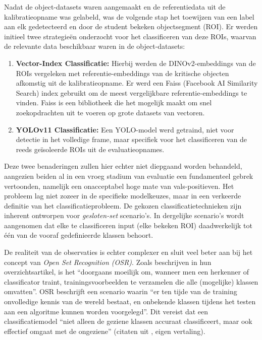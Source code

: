 Nadat de object-datasets waren aangemaakt en de referentiedata uit de kalibratieopname was gelabeld, was de volgende stap het 
toewijzen van een label aan elk gedetecteerd en door de student bekeken objectsegment (ROI). 
Er werden initieel twee strategieën onderzocht voor het classificeren van deze ROIs, waarvan de relevante data beschikbaar waren in de object-datasets:
\begin{enumerate}
    \item \textbf{Vector-Index Classificatie:} Hierbij werden de DINOv2-embeddings van de ROIs vergeleken met referentie-embeddings van de kritische objecten afkomstig uit de kalibratieopname.
    Er werd een Faiss (Facebook AI Similarity Search) index gebruikt om de meest vergelijkbare referentie-embeddings te vinden.
    Faiss is een bibliotheek die het mogelijk maakt om snel zoekopdrachten uit te voeren op grote datasets van vectoren.
    \item \textbf{YOLOv11 Classificatie:} Een YOLO-model werd getraind, niet voor detectie in het volledige frame, maar specifiek voor het classificeren van de reeds 
    geïsoleerde ROIs uit de evaluatieopnames.
\end{enumerate}

Deze twee benaderingen zullen hier echter niet diepgaand worden behandeld, 
aangezien beiden al in een vroeg stadium van evaluatie een fundamenteel gebrek vertoonden, 
namelijk een onacceptabel hoge mate van vals-positieven. 
Het probleem lag niet zozeer in de specifieke modelkeuzes, maar in een verkeerde definitie van het classificatieprobleem.
De gekozen classificatietechnieken zijn inherent ontworpen voor \textit{gesloten-set} scenario's. 
In dergelijke scenario's  wordt aangenomen dat elke te classificeren input (elke bekeken ROI)
daadwerkelijk tot één van de vooraf gedefinieerde klassen behoort. 

De realiteit van de observaties is echter complexer en sluit veel beter aan bij het concept van \textit{Open Set Recognition (OSR)}. 
Zoals \textcite{Wang2023} beschrijven in hun overzichtsartikel, is het 
``doorgaans moeilijk om, wanneer men een herkenner of classificator traint, trainingsvoorbeelden te verzamelen die alle (mogelijke) klassen omvatten''.
OSR beschrijft een scenario waarin 
``er ten tijde van de training onvolledige kennis van de wereld bestaat, en onbekende klassen tijdens het testen aan een algoritme kunnen worden voorgelegd''.
Dit vereist dat een classificatiemodel ``niet alleen de geziene klassen accuraat classificeert, maar ook effectief omgaat met de ongeziene'' (citaten uit \textcite{Wang2023}, eigen vertaling).

